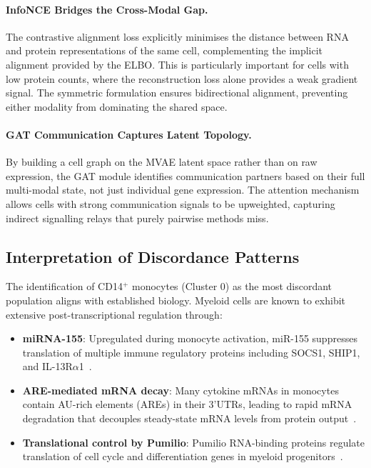 \documentclass[11pt,a4paper]{article}
\begin{document}
\paragraph{InfoNCE Bridges the Cross-Modal Gap.}
The contrastive alignment loss explicitly minimises the distance between RNA and protein representations of the same cell, complementing the implicit alignment provided by the ELBO.
This is particularly important for cells with low protein counts, where the reconstruction loss alone provides a weak gradient signal.
The symmetric formulation ensures bidirectional alignment, preventing either modality from dominating the shared space.

\paragraph{GAT Communication Captures Latent Topology.}
By building a cell graph on the MVAE latent space rather than on raw expression, the GAT module identifies communication partners based on their full multi-modal state, not just individual gene expression.
The attention mechanism allows cells with strong communication signals to be upweighted, capturing indirect signalling relays that purely pairwise methods miss.

\subsection{Interpretation of Discordance Patterns}

The identification of CD14$^+$ monocytes (Cluster 0) as the most discordant population aligns with established biology.
Myeloid cells are known to exhibit extensive post-transcriptional regulation through:

\begin{itemize}[leftmargin=*]
  \item \textbf{miRNA-155}: Upregulated during monocyte activation, miR-155 suppresses translation of multiple immune regulatory proteins including SOCS1, SHIP1, and IL-13R$\alpha$1~\citep{ohara2010,koch2012}.
  \item \textbf{ARE-mediated mRNA decay}: Many cytokine mRNAs in monocytes contain AU-rich elements (AREs) in their 3'UTRs, leading to rapid mRNA degradation that decouples steady-state mRNA levels from protein output~\citep{chen2007}.
  \item \textbf{Translational control by Pumilio}: Pumilio RNA-binding proteins regulate translation of cell cycle and differentiation genes in myeloid progenitors~\citep{lin2018pump}.
\end{itemize}
\end{document}
